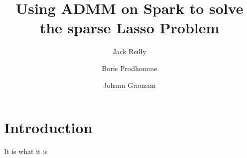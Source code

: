 \documentclass[english]{article}
\begin{document}
\title{Using ADMM on Spark to solve the sparse Lasso Problem}


\author{Jack Reilly\and Boris Prodhomme\and Johann Grauzam}

\maketitle

\section{Introduction}
It is what it is
\end{document}

